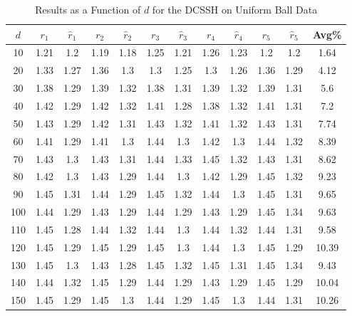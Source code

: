 \documentclass[11pt,twoside]{report}
\theoremstyle{definition}
\numberwithin{theorem}{section}
\numberwithin{definition}{section}
\numberwithin{lemma}{section}
\numberwithin{proposition}{section}
\numberwithin{equation}{section}
\numberwithin{figure}{section}
\begin{document}
\begin{appendices}
    \begin{table}[ht]
        \centering
        \begin{tabular}{|c||cc||cc||cc||cc||cc||c|} \hline
            $d$&$r_1$&$\hat{r}_1$&$r_2$&$\hat{r}_2$&$r_3$&$\hat{r}_3$&$r_4$&$\hat{r}_4$&$r_5$&$\hat{r}_5$&Avg\% \\ \hline
            10&1.21&1.2&1.19&1.18&1.25&1.21&1.26&1.23&1.2&1.2&1.64 \\
            20&1.33&1.27&1.36&1.3&1.3&1.25&1.3&1.26&1.36&1.29&4.12 \\
            30&1.38&1.29&1.39&1.32&1.38&1.31&1.39&1.32&1.39&1.31&5.6 \\
            40&1.42&1.29&1.42&1.32&1.41&1.28&1.38&1.32&1.41&1.31&7.2 \\
            50&1.43&1.29&1.42&1.31&1.43&1.32&1.41&1.32&1.43&1.31&7.74 \\
            60&1.41&1.29&1.41&1.3&1.44&1.3&1.42&1.3&1.44&1.32&8.39 \\
            70&1.43&1.3&1.43&1.31&1.44&1.33&1.45&1.32&1.43&1.31&8.62 \\
            80&1.42&1.3&1.43&1.29&1.44&1.3&1.42&1.29&1.45&1.32&9.23 \\
            90&1.45&1.31&1.44&1.29&1.45&1.32&1.44&1.3&1.45&1.31&9.65 \\
            100&1.44&1.29&1.43&1.29&1.44&1.29&1.43&1.29&1.45&1.34&9.63 \\
            110&1.45&1.28&1.44&1.32&1.44&1.3&1.44&1.32&1.44&1.31&9.58 \\
            120&1.45&1.29&1.45&1.29&1.45&1.3&1.44&1.3&1.45&1.29&10.39 \\
            130&1.45&1.3&1.43&1.28&1.45&1.32&1.45&1.31&1.45&1.34&9.43 \\
            140&1.44&1.32&1.45&1.29&1.44&1.29&1.43&1.29&1.45&1.29&10.04 \\
            150&1.45&1.29&1.45&1.3&1.44&1.29&1.45&1.3&1.44&1.31&10.26 \\ \hline
        \end{tabular}
        \caption{Results as a Function of $d$ for the DCSSH on Uniform Ball Data}
        \label{tab:uniform_ball_dcssh_table_d}
    \end{table}
    \clearpage
    
    

\end{appendices}
\end{document}

